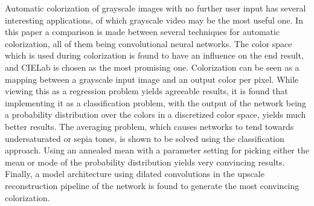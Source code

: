 Automatic colorization of grayscale images with no further user input has several interesting applications, of which grayscale video may be the most useful one. In this paper a comparison is made between several techniques for automatic colorization, all of them being convolutional neural networks. The color space which is used during colorization is found to have an influence on the end result, and CIELab is chosen as the most promising one. Colorization can be seen as a mapping between a grayscale input image and an output color per pixel. While viewing this as a regression problem yields agreeable results, it is found that implementing it as a classification problem, with the output of the network being a probability distribution over the colors in a discretized color space, yields much better results. The averaging problem, which causes networks to tend towards undersaturated or sepia tones, is shown to be solved using the classification approach. Using an annealed mean with a parameter setting for picking either the mean or mode of the probability distribution yields very convincing results. Finally, a model architecture using dilated convolutions in the upscale reconstruction pipeline of the network is found to generate the most convincing colorization.

